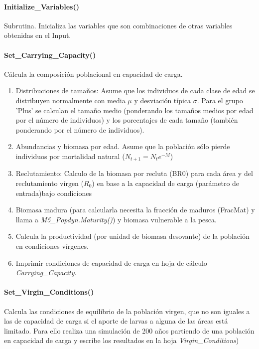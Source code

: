 			\paragraph{Initialize\_Variables()}
				Subrutina. Inicializa las variables que son combinaciones de otras variables obtenidas en el Input. 
			\paragraph{Set\_Carrying\_Capacity()}
				Cálcula la composición poblacional en capacidad de carga. 
					\begin{enumerate}
						\item Distribuciones de tamaños: Asume que los individuos de cada clase de edad se distribuyen normalmente con media $\mu$ y desviación típica $\sigma$. Para el grupo 'Plus' se calculan el tamaño medio (ponderando los tamaños medios por edad por el número de individuos) y los porcentajes de cada tamaño (también ponderando por el número de individuos). 
						\item Abundancias y biomasa por edad. Asume que la población sólo pierde individuos por mortalidad natural ($N_{t+1}=N_t e^{-M}$)
						\item Reclutamiento: Calculo de la biomasa por recluta (BR0) para cada área y del reclutamiento vírgen ($R_0$) en base a la capacidad de carga (parámetro de entrada)bajo condiciones  
						\item Biomasa madura (para calcularla necesita la fracción de maduros (FracMat) y llama a \emph{M5\_Popdyn.Maturity()}) y biomasa vulnerable a la pesca. 
						\item Calcula la productividad (por unidad de biomasa desovante) de la población en condiciones vírgenes. 
						\item Imprimir condiciones de capacidad de carga en hoja de cálculo \emph{Carrying\_Capacity}. 
					\end{enumerate}
			\paragraph{Set\_Virgin\_Conditions()}
			Calcula las condiciones de equilibrio de la población virgen, que no son iguales a las de capacidad de carga si el aporte de larvas a alguna de las áreas está limitado. 
			Para ello realiza una simulación de 200 años partiendo de una población en capacidad de carga y escribe los resultados en la hoja \emph{Virgin\_Conditions})
